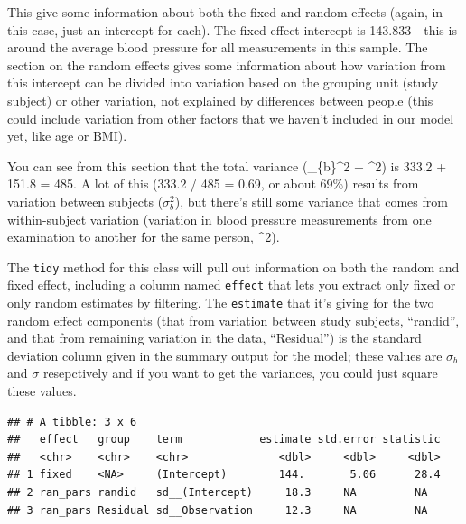 \documentclass[
]{book}
\newenvironment{Shaded}{\begin{snugshade}}{\end{snugshade}}
\newcommand{\KeywordTok}[1]{\textcolor[rgb]{0.13,0.29,0.53}{\textbf{#1}}}
\newcommand{\NormalTok}[1]{#1}
\newcommand{\OperatorTok}[1]{\textcolor[rgb]{0.81,0.36,0.00}{\textbf{#1}}}
\newcommand{\StringTok}[1]{\textcolor[rgb]{0.31,0.60,0.02}{#1}}
\begin{document}
This give some information about both the fixed and random effects (again, in
this case, just an intercept for each). The fixed effect intercept is
143.833---this is around the average blood pressure for all measurements in this
sample. The section on the random effects gives some information about
how variation from this intercept can be divided into variation based on the
grouping unit (study subject) or other variation, not explained by differences
between people (this could include variation from other
factors that we haven't included in our model yet, like age or BMI).

You can see from this section that the total variance (\sigma\_\{b\}\^{}2 + \sigma\^{}2)
is 333.2 + 151.8 = 485. A lot of this (333.2 / 485 = 0.69, or about 69\%) results
from variation between subjects (\(\sigma_{b}^2\)), but there's still some variance
that comes from within-subject variation (variation in blood pressure measurements
from one examination to another for the same person, \sigma\^{}2).

The \texttt{tidy} method for this class will pull out information on both the random
and fixed effect, including a column named \texttt{effect} that lets you extract only
fixed or only random estimates by filtering. The \texttt{estimate} that it's giving for
the two random effect components (that from variation between study subjects,
``randid'', and that from remaining variation in the data, ``Residual'') is the
standard deviation column given in the summary output for the model; these values
are \(\sigma_{b}\) and \(\sigma\) resepctively and if you want to get the variances,
you could just square these values.

\begin{Shaded}
\end{Shaded}

\begin{verbatim}
## # A tibble: 3 x 6
##   effect   group    term            estimate std.error statistic
##   <chr>    <chr>    <chr>              <dbl>     <dbl>     <dbl>
## 1 fixed    <NA>     (Intercept)        144.       5.06      28.4
## 2 ran_pars randid   sd__(Intercept)     18.3     NA         NA  
## 3 ran_pars Residual sd__Observation     12.3     NA         NA
\end{verbatim}
\end{document}
